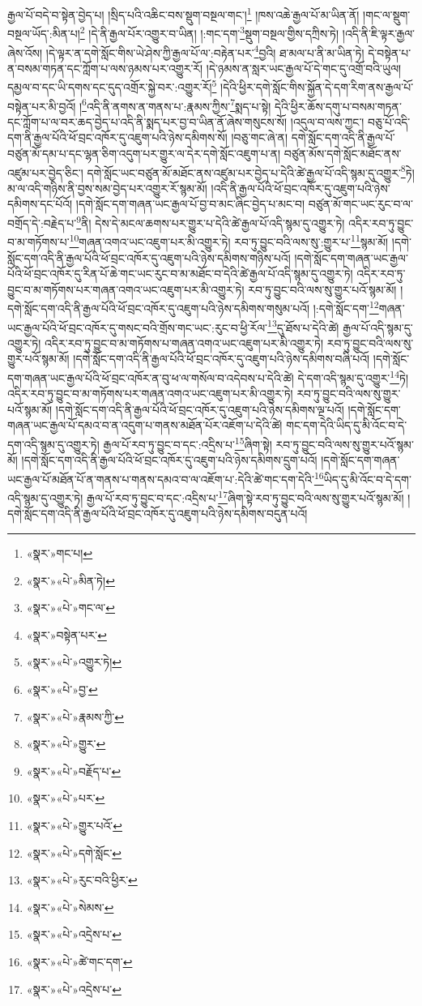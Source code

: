 རྒྱལ་པོ་བདེ་བ་སྟེན་བྱེད་པ། །སྲིད་པའི་འཆིང་བས་སྡུག་བསྔལ་གང་།\footnote{«སྣར་»གང་པ།} །ཁས་འཆེ་རྒྱལ་པོ་མ་ཡིན་ནོ། །གང་ལ་སྡུག་བསྔལ་ཡོད་:མིན་པ།\footnote{«སྣར་»«པེ་»མིན་ཏེ།} །དེ་ནི་རྒྱལ་པོར་འགྱུར་བ་ཡིན། །:གང་དག་\footnote{«སྣར་»«པེ་»གང་ལ་}སྡུག་བསྔལ་གྱིས་དཀྲིས་ཏེ། །འདི་ནི་ཇི་ལྟར་རྒྱལ་ཞེས་འོས། །དེ་ལྟར་ན་དགེ་སློང་གིས་ཡེ་ཤེས་ཀྱི་རྒྱལ་པོ་ལ་:བརྟེན་པར་\footnote{«སྣར་»བསྟེན་པར་}བྱའི། ཐ་མལ་པ་ནི་མ་ཡིན་ཏེ། དེ་བསྟེན་པ་ན་བསམ་གཏན་དང་ཀློག་པ་ལས་ཉམས་པར་འགྱུར་རོ། །དེ་ཉམས་ན་སླར་ཡང་རྒྱལ་པོ་དེ་གང་དུ་འགྲོ་བའི་ཡུལ། དམྱལ་བ་དང་ཡི་དགས་དང་དུད་འགྲོར་སྐྱེ་བར་:འགྱུར་རོ།\footnote{«སྣར་»«པེ་»འགྱུར་ཏེ།} །དེའི་ཕྱིར་དགེ་སློང་གིས་སྐྱོན་དེ་དག་རིག་ནས་རྒྱལ་པོ་བསྟེན་པར་མི་བྱའོ། །\footnote{«སྣར་»«པེ་»བྱ་}འདི་ནི་ནགས་ན་གནས་པ་:རྣམས་ཀྱིས་\footnote{«སྣར་»«པེ་»རྣམས་ཀྱི་}སྨད་པ་སྟེ། དེའི་ཕྱིར་ཆོས་དགུ་པ་བསམ་གཏན་དང་ཀློག་པ་ལ་བར་ཆད་བྱེད་པ་འདི་ནི་སྨད་པར་བྱ་བ་ཡིན་ནོ་ཞེས་གསུངས་སོ། །འདུལ་བ་ལས་ཀྱང་། བཅུ་པོ་འདི་དག་ནི་རྒྱལ་པོའི་ཕོ་བྲང་འཁོར་དུ་འཇུག་པའི་ཉེས་དམིགས་སོ། །བཅུ་གང་ཞེ་ན། དགེ་སློང་དག་འདི་ནི་རྒྱལ་པོ་བཙུན་མོ་དམ་པ་དང་ལྷན་ཅིག་འདུག་པར་གྱུར་ལ་དེར་དགེ་སློང་འཇུག་པ་ན། བཙུན་མོས་དགེ་སློང་མཐོང་ནས་འཛུམ་པར་བྱེད་ཅིང་། དགེ་སློང་ཡང་བཙུན་མོ་མཐོང་ནས་འཛུམ་པར་བྱེད་པ་དེའི་ཚེ་རྒྱལ་པོ་འདི་སྙམ་དུ་འགྱུར་\footnote{«སྣར་»«པེ་»གྱུར་}ཏེ། མ་ལ་འདི་གཉིས་ནི་བྱས་སམ་བྱེད་པར་འགྱུར་རོ་སྙམ་མོ། །འདི་ནི་རྒྱལ་པོའི་ཕོ་བྲང་འཁོར་དུ་འཇུག་པའི་ཉེས་དམིགས་དང་པོའོ། །དགེ་སློང་དག་གཞན་ཡང་རྒྱལ་པོ་བྱ་བ་མང་ཞིང་བྱེད་པ་མང་བ། བཙུན་མོ་གང་ཡང་རུང་བ་ལ་བགྲོད་དེ་:བརྗེད་པ་\footnote{«སྣར་»«པེ་»བརྗོད་པ་}ནི། དེས་དེ་མངལ་ཆགས་པར་གྱུར་པ་དེའི་ཚེ་རྒྱལ་པོ་འདི་སྙམ་དུ་འགྱུར་ཏེ། འདིར་རབ་ཏུ་བྱུང་བ་མ་གཏོགས་པ་\footnote{«སྣར་»«པེ་»པར་}གཞན་འགའ་ཡང་འཇུག་པར་མི་འགྱུར་ཏེ། རབ་ཏུ་བྱུང་བའི་ལས་སུ་:གྱུར་པ་\footnote{«སྣར་»«པེ་»གྱུར་པའོ་}སྙམ་མོ། །དགེ་སློང་དག་འདི་ནི་རྒྱལ་པོའི་ཕོ་བྲང་འཁོར་དུ་འཇུག་པའི་ཉེས་དམིགས་གཉིས་པའོ། །དགེ་སློང་དག་གཞན་ཡང་རྒྱལ་པོའི་ཕོ་བྲང་འཁོར་དུ་རིན་པོ་ཆེ་གང་ཡང་རུང་བ་མ་མཐོང་བ་དེའི་ཚེ་རྒྱལ་པོ་འདི་སྙམ་དུ་འགྱུར་ཏེ། འདིར་རབ་ཏུ་བྱུང་བ་མ་གཏོགས་པར་གཞན་འགའ་ཡང་འཇུག་པར་མི་འགྱུར་ཏེ། རབ་ཏུ་བྱུང་བའི་ལས་སུ་གྱུར་པའོ་སྙམ་མོ། །དགེ་སློང་དག་འདི་ནི་རྒྱལ་པོའི་ཕོ་བྲང་འཁོར་དུ་འཇུག་པའི་ཉེས་དམིགས་གསུམ་པའོ། །:དགེ་སློང་དག་\footnote{«སྣར་»«པེ་»དགེ་སློང་}གཞན་ཡང་རྒྱལ་པོའི་ཕོ་བྲང་འཁོར་དུ་གསང་བའི་གྲོས་གང་ཡང་:རུང་བ་ཕྱི་རོལ་\footnote{«སྣར་»«པེ་»རུང་བའི་ཕྱིར་}དུ་ཐོས་པ་དེའི་ཚེ། རྒྱལ་པོ་འདི་སྙམ་དུ་འགྱུར་ཏེ། འདིར་རབ་ཏུ་བྱུང་བ་མ་གཏོགས་པ་གཞན་འགའ་ཡང་འཇུག་པར་མི་འགྱུར་ཏེ། རབ་ཏུ་བྱུང་བའི་ལས་སུ་གྱུར་པའོ་སྙམ་མོ། །དགེ་སློང་དག་འདི་ནི་རྒྱལ་པོའི་ཕོ་བྲང་འཁོར་དུ་འཇུག་པའི་ཉེས་དམིགས་བཞི་པའོ། །དགེ་སློང་དག་གཞན་ཡང་རྒྱལ་པོའི་ཕོ་བྲང་འཁོར་ན་བུ་ཕ་ལ་གསོལ་བ་འདེབས་པ་དེའི་ཚེ། དེ་དག་འདི་སྙམ་དུ་འགྱུར་\footnote{«སྣར་»«པེ་»སེམས་}ཏེ། འདིར་རབ་ཏུ་བྱུང་བ་མ་གཏོགས་པར་གཞན་འགའ་ཡང་འཇུག་པར་མི་འགྱུར་ཏེ། རབ་ཏུ་བྱུང་བའི་ལས་སུ་གྱུར་པའོ་སྙམ་མོ། །དགེ་སློང་དག་འདི་ནི་རྒྱལ་པོའི་ཕོ་བྲང་འཁོར་དུ་འཇུག་པའི་ཉེས་དམིགས་ལྔ་པའོ། །དགེ་སློང་དག་གཞན་ཡང་རྒྱལ་པོ་དམའ་བ་ན་འདུག་པ་གནས་མཐོན་པོར་འཇོག་པ་དེའི་ཚེ། གང་དག་དེའི་ཡིད་དུ་མི་འོང་བ་དེ་དག་འདི་སྙམ་དུ་འགྱུར་ཏེ། རྒྱལ་པོ་རབ་ཏུ་བྱུང་བ་དང་:འདྲིས་པ་\footnote{«སྣར་»«པེ་»འདྲེས་པ་}ཞིག་སྟེ། རབ་ཏུ་བྱུང་བའི་ལས་སུ་གྱུར་པའོ་སྙམ་མོ། །དགེ་སློང་དག་འདི་ནི་རྒྱལ་པོའི་ཕོ་བྲང་འཁོར་དུ་འཇུག་པའི་ཉེས་དམིགས་དྲུག་པའོ། །དགེ་སློང་དག་གཞན་ཡང་རྒྱལ་པོ་མཐོན་པོ་ན་གནས་པ་གནས་དམའ་བ་ལ་འཇོག་པ་:དེའི་ཚེ་གང་དག་དེའི་\footnote{«སྣར་»«པེ་»ཚེ་གང་དག་}ཡིད་དུ་མི་འོང་བ་དེ་དག་འདི་སྙམ་དུ་འགྱུར་ཏེ། རྒྱལ་པོ་རབ་ཏུ་བྱུང་བ་དང་:འདྲིས་པ་\footnote{«སྣར་»«པེ་»འདྲེས་པ་}ཞིག་སྟེ་རབ་ཏུ་བྱུང་བའི་ལས་སུ་གྱུར་པའོ་སྙམ་མོ། །དགེ་སློང་དག་འདི་ནི་རྒྱལ་པོའི་ཕོ་བྲང་འཁོར་དུ་འཇུག་པའི་ཉེས་དམིགས་བདུན་པའོ། 